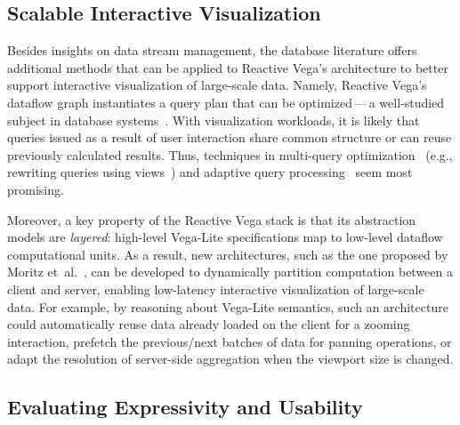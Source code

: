 \vspace{-10pt}

\subsection{Scalable Interactive Visualization}

\vspace{-7pt}

Besides insights on data stream management, the database literature offers
additional methods that can be applied to Reactive Vega's architecture to better
support interactive visualization of large-scale data. Namely, Reactive Vega's
dataflow graph instantiates a query plan that can be optimized\,---\,a
well-studied subject in database systems~\cite{graefe:volcano,selinger:access}.
With visualization workloads, it is likely that queries issued as a result of
user interaction share common structure or can reuse previously calculated
results. Thus, techniques in multi-query optimization~\cite{roy:multiquery}
(e.g., rewriting queries using views~\cite{halevy:answering}) and adaptive query
processing~\cite{deshpande:adaptive,avnur:eddies} seem most promising.

Moreover, a key property of the Reactive Vega stack is that its abstraction
models are \emph{layered}: high-level Vega-Lite specifications map to low-level
dataflow computational units. As a result, new architectures, such as the one
proposed by Moritz et~al.~\cite{domoritz:dsia}, can be developed to dynamically
partition computation between a client and server, enabling low-latency
interactive visualization of large-scale data. For example, by reasoning about
Vega-Lite semantics, such an architecture could automatically reuse data already
loaded on the client for a zooming interaction, prefetch the previous/next
batches of data for panning operations, or adapt the resolution of server-side
aggregation when the viewport size is changed.

\vspace{-10pt}

\subsection{Evaluating Expressivity and Usability}

\vspace{-7pt}

